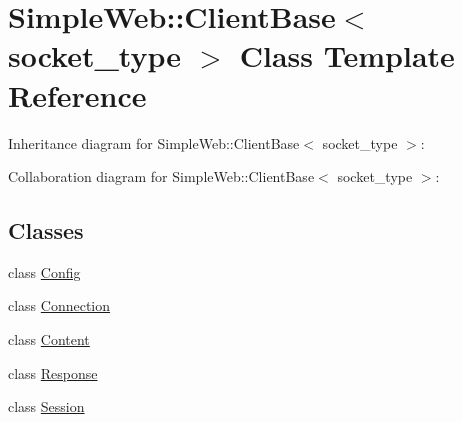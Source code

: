 \hypertarget{classSimpleWeb_1_1ClientBase}{}\section{Simple\+Web\+:\+:Client\+Base$<$ socket\+\_\+type $>$ Class Template Reference}
\label{classSimpleWeb_1_1ClientBase}


Inheritance diagram for Simple\+Web\+:\+:Client\+Base$<$ socket\+\_\+type $>$\+:


Collaboration diagram for Simple\+Web\+:\+:Client\+Base$<$ socket\+\_\+type $>$\+:
\subsection*{Classes}
\begin{DoxyCompactItemize}
\item 
class \hyperlink{classSimpleWeb_1_1ClientBase_1_1Config}{Config}
\item 
class \hyperlink{classSimpleWeb_1_1ClientBase_1_1Connection}{Connection}
\item 
class \hyperlink{classSimpleWeb_1_1ClientBase_1_1Content}{Content}
\item 
class \hyperlink{classSimpleWeb_1_1ClientBase_1_1Response}{Response}
\item 
class \hyperlink{classSimpleWeb_1_1ClientBase_1_1Session}{Session}
\end{DoxyCompactItemize}
